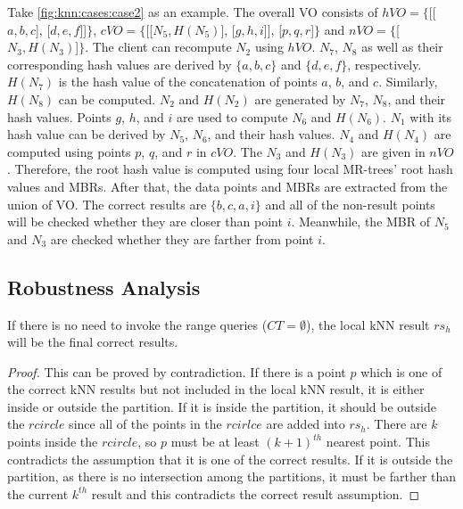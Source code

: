 Take \cref{fig:knn:cases:case2} as an example. The overall VO consists of $hVO=\{$[[$a, b, c$], [$d, e, f$]]$\}$, $cVO=\{$[[$N_{5}, H(N_{5})$], [$g, h, i$]], [$p, q, r$]$\}$ and $nVO=\{$[$N_{3}, H(N_{3})$]$\}$. The client can recompute $N_{2}$ using $hVO$. $N_{7}$, $N_{8}$ as well as their corresponding hash values are derived by $\{a, b, c\}$ and $\{d, e, f\}$, respectively. $H(N_{7})$ is the hash value of the concatenation of points $a$, $b$, and $c$. Similarly, $H(N_{8})$ can be computed. $N_{2}$ and $H(N_{2})$ are generated by $N_{7}$, $N_{8}$, and their hash values. Points $g$, $h$, and $i$ are used to compute $N_{6}$ and $H(N_{6})$. $N_{1}$ with its hash value can be derived by $N_{5}$, $N_{6}$, and their hash values. $N_{4}$ and $H(N_{4})$ are computed using points $p$, $q$, and $r$ in $cVO$. The $N_{3}$ and $H(N_{3})$ are given in $nVO$. Therefore, the root hash value is computed using four local MR-trees' root hash values and MBRs. After that, the data points and MBRs are extracted from the union of VO\@. The correct results are $\{b, c, a, i\}$ and all of the non-result points will be checked whether they are closer than point $i$. Meanwhile, the MBR of $N_{5}$ and $N_{3}$ are checked whether they are farther from point $i$.

\subsection{Robustness Analysis}

\begin{lemma}\label{lem:knn:l1}
  If there is no need to invoke the range queries ($CT=\emptyset$), the local kNN result $rs_{h}$ will be the final correct results.
\end{lemma}

\begin{proof}
  This can be proved by contradiction. If there is a point $p$ which is one of the correct kNN results but not included in the local kNN result, it is either inside or outside the partition. If it is inside the partition, it should be outside the $rcircle$ since all of the points in the $rcirlce$ are added into $rs_{h}$. There are $k$ points inside the $rcircle$, so $p$ must be at least ${(k+1)}^{th}$ nearest point. This contradicts the assumption that it is one of the correct results. If it is outside the partition, as there is no intersection among the partitions, it must be farther than the current $k^{th}$ result and this contradicts the correct result assumption.
\end{proof}

